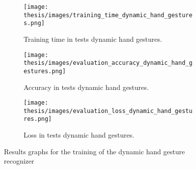 \documentclass[../thesis.tex]{subfiles}
\begin{document}
\begin{figure}[H]
     \centering
     \begin{subfigure}[b]{0.45\textwidth}
         \centering
         \texttt{[image: thesis/images/training\_time\_dynamic\_hand\_gestures.png]}
         \caption{Training time in tests dynamic hand gestures.}
         \label{fig:training_time_static_hand_gestures}
     \end{subfigure}
     \hfill
     \begin{subfigure}[b]{0.45\textwidth}
         \centering
         \texttt{[image: thesis/images/evaluation\_accuracy\_dynamic\_hand\_gestures.png]}
         \caption{Accuracy in tests dynamic hand gestures.}
         \label{fig:evaluation_accuracy_static_hand_gestures}
     \end{subfigure}
     \hfill
     \begin{subfigure}[b]{0.45\textwidth}
         \centering
         \texttt{[image: thesis/images/evaluation\_loss\_dynamic\_hand\_gestures.png]}
         \caption{Loss in tests dynamic hand gestures.}
         \label{fig:evaluation_loss_static_hand_gestures.}
     \end{subfigure}
        \caption{Results graphs for the training of the dynamic hand gesture recognizer}
        \label{fig:results_graphs_static_hand_gestures}
\end{figure}
\end{document}

